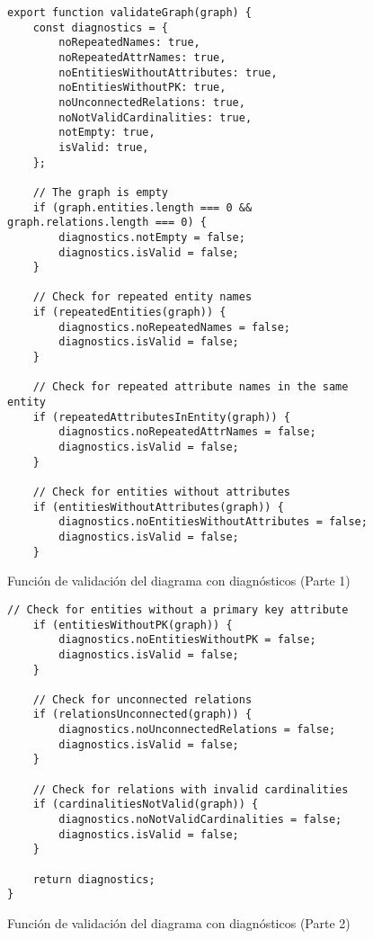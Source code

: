 \begin{figure}[h]
\lstset{breaklines=true, basicstyle=\footnotesize}
\begin{lstlisting}[frame=single]
export function validateGraph(graph) {
    const diagnostics = {
        noRepeatedNames: true,
        noRepeatedAttrNames: true,
        noEntitiesWithoutAttributes: true,
        noEntitiesWithoutPK: true,
        noUnconnectedRelations: true,
        noNotValidCardinalities: true,
        notEmpty: true,
        isValid: true,
    };

    // The graph is empty
    if (graph.entities.length === 0 && graph.relations.length === 0) {
        diagnostics.notEmpty = false;
        diagnostics.isValid = false;
    }

    // Check for repeated entity names
    if (repeatedEntities(graph)) {
        diagnostics.noRepeatedNames = false;
        diagnostics.isValid = false;
    }

    // Check for repeated attribute names in the same entity
    if (repeatedAttributesInEntity(graph)) {
        diagnostics.noRepeatedAttrNames = false;
        diagnostics.isValid = false;
    }

    // Check for entities without attributes
    if (entitiesWithoutAttributes(graph)) {
        diagnostics.noEntitiesWithoutAttributes = false;
        diagnostics.isValid = false;
    }
\end{lstlisting}
\caption{Función de validación del diagrama con diagnósticos (Parte 1)}
\end{figure}
\clearpage
\begin{figure}[h]
\lstset{breaklines=true, basicstyle=\footnotesize}
\begin{lstlisting}[frame=single]
// Check for entities without a primary key attribute
    if (entitiesWithoutPK(graph)) {
        diagnostics.noEntitiesWithoutPK = false;
        diagnostics.isValid = false;
    }

    // Check for unconnected relations
    if (relationsUnconnected(graph)) {
        diagnostics.noUnconnectedRelations = false;
        diagnostics.isValid = false;
    }

    // Check for relations with invalid cardinalities
    if (cardinalitiesNotValid(graph)) {
        diagnostics.noNotValidCardinalities = false;
        diagnostics.isValid = false;
    }

    return diagnostics;
}
\end{lstlisting}
\caption{Función de validación del diagrama con diagnósticos (Parte 2)}
\end{figure}

